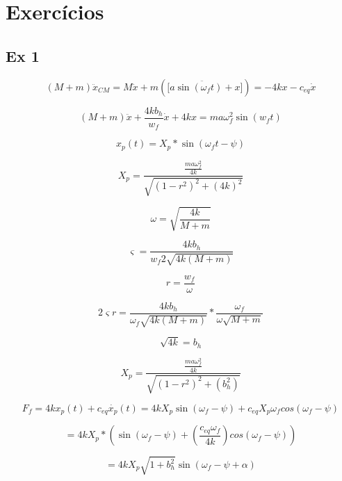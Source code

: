 \chapter{Exercícios}

\section{Ex 1}


  
\[(M+m)\ddot{x}_{CM}=M\ddot{x}+m(\ddot{[a\sin (\omega_{f}t)+x}])=-4kx-c_{eq}\dot{x}\]
 
\[(M+m)\ddot{x}+\frac{4kb_{h}}{w_{f}}\dot{x}+4kx=ma\omega_{f}^{2}\sin(w_{f}t)\]
 
\[x_{p}(t)=X_{p}*\sin(\omega_f t-\psi)\]
 
\[X_{p}=\frac{\frac{ma\omega_{f}^{2}}{4k}}{\sqrt{(1-r^{2})^{2}+(4k)^{2}}}\]
 
\[\omega=\sqrt{\frac{4k}{M+m}}\]

\[\varsigma=\frac{4kb_{h}}{w_f2\sqrt{4k(M+m)}}\] 
 
\[r=\frac{w_{f}}{\omega}\]


\[2\varsigma r= \frac{4kb_{h}}{\omega_{f}\sqrt{4k(M+m)}}*\frac{\omega_f}{\omega\sqrt{M+m}}  \]
 
\[{\sqrt{4k}} = b_{h}\]
 
\[X_{p}=\frac{\frac{ma\omega_f ^{2}}{4k}}{\sqrt{(1-r^{2})^{2}+(b_{h}^{2})}}\]
 
\[F_{f}=4kx_{p}(t)+c_{eq}\dot{x_{p}}(t)=4kX_{p}\sin(\omega_{f}-\psi)+c_{eq}X_{p}\omega_{f}cos(\omega_{f}-\psi)
\]
 
\[=4kX_{p}*(\sin(\omega_{f}-\psi)+(\frac{c_{eq}\omega_{f}}{4k})cos(\omega_{f}-\psi))\]
 
\[=4kX_{p}\sqrt{1+b_{h}^{2}}\sin(\omega_f-\psi+\alpha)\]

